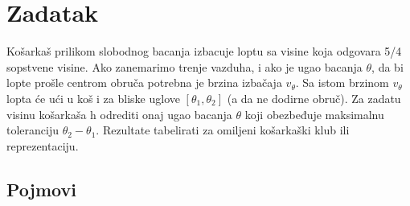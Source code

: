 \documentclass[a4paper, 12pt]{article}
\begin{document}

\pagebreak

\tableofcontents

\pagebreak

\section{Zadatak}

Košarkaš prilikom slobodnog bacanja izbacuje loptu sa visine koja odgovara 5/4 sopstvene visine. Ako zanemarimo trenje vazduha, i ako je ugao bacanja $\theta$, da bi lopte prošle centrom obruča potrebna je brzina izbačaja $v_\theta$. Sa istom brzinom $v_\theta$ lopta će ući u koš i za bliske uglove $[\theta_1, \theta_2]$ (a da ne dodirne obruč). Za zadatu visinu košarkaša h odrediti onaj ugao bacanja $\theta$ koji obezbeđuje maksimalnu toleranciju $\theta_2 - \theta_1$. Rezultate tabelirati za omiljeni košarkaški klub ili reprezentaciju.

\subsection{Pojmovi}
\end{document}
